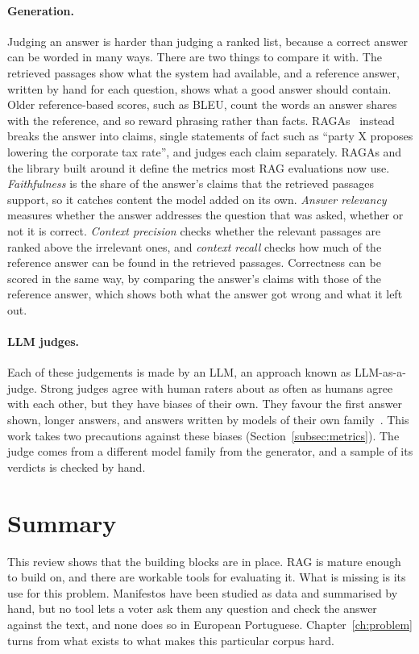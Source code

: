 \paragraph{Generation.} Judging an answer is harder than judging a ranked list, because a correct answer can be worded in many ways. There are two things to compare it with. The retrieved passages show what the system had available, and a reference answer, written by hand for each question, shows what a good answer should contain. Older reference-based scores, such as BLEU, count the words an answer shares with the reference, and so reward phrasing rather than facts. RAGAs~\citep{es2024ragas} instead breaks the answer into claims, single statements of fact such as ``party X proposes lowering the corporate tax rate'', and judges each claim separately. RAGAs and the library built around it define the metrics most RAG evaluations now use. \emph{Faithfulness} is the share of the answer's claims that the retrieved passages support, so it catches content the model added on its own. \emph{Answer relevancy} measures whether the answer addresses the question that was asked, whether or not it is correct. \emph{Context precision} checks whether the relevant passages are ranked above the irrelevant ones, and \emph{context recall} checks how much of the reference answer can be found in the retrieved passages. Correctness can be scored in the same way, by comparing the answer's claims with those of the reference answer, which shows both what the answer got wrong and what it left out.

\paragraph{LLM judges.} Each of these judgements is made by an LLM, an approach known as LLM-as-a-judge. Strong judges agree with human raters about as often as humans agree with each other, but they have biases of their own. They favour the first answer shown, longer answers, and answers written by models of their own family~\citep{zheng2023judging}. This work takes two precautions against these biases (Section~\ref{subsec:metrics}). The judge comes from a different model family from the generator, and a sample of its verdicts is checked by hand.

\section*{Summary}

This review shows that the building blocks are in place. RAG is mature enough to build on, and there are workable tools for evaluating it. What is missing is its use for this problem. Manifestos have been studied as data and summarised by hand, but no tool lets a voter ask them any question and check the answer against the text, and none does so in European Portuguese. Chapter~\ref{ch:problem} turns from what exists to what makes this particular corpus hard.
